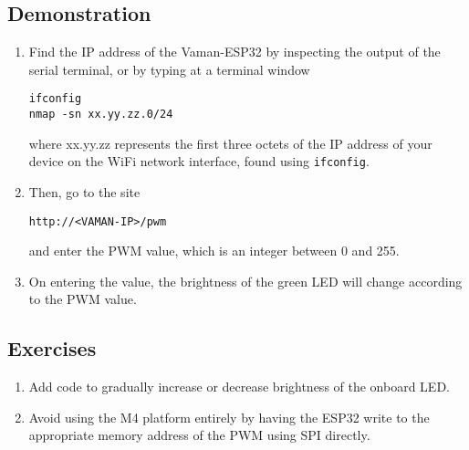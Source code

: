\subsection{Demonstration}
\begin{enumerate}[resume]
    \item Find the IP address of the Vaman-ESP32 by inspecting the output of the
    serial terminal, or by typing at a terminal window
    \begin{lstlisting}
ifconfig
nmap -sn xx.yy.zz.0/24
    \end{lstlisting}
    where xx.yy.zz represents the first three octets of the IP address of your
    device on the WiFi network interface, found using \texttt{ifconfig}.
    \item Then, go to the site 
    \begin{lstlisting}
http://<VAMAN-IP>/pwm 
    \end{lstlisting}
    and enter the PWM value, which is an integer between 0 and 255.
    \item On entering the value, the brightness of the green LED will change 
    according to the PWM value.
\end{enumerate}

\subsection{Exercises}
\begin{enumerate}[resume]
    \item Add code to gradually increase or decrease brightness of the onboard
    LED.
    \item Avoid using the M4 platform entirely by having the ESP32 write to the
    appropriate memory address of the PWM using SPI directly.
\end{enumerate}